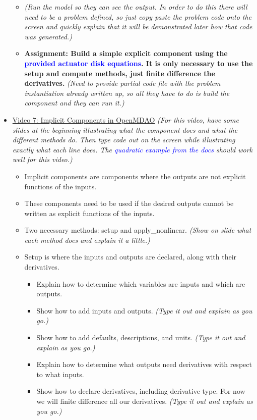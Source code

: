 \documentclass[12pt, letterpaper]{article}
\begin{document}
\begin{itemize}
\begin{itemize}
			\item \textit{(Run the model so they can see the output. In order to do this there will need to be a problem defined, so just copy paste the problem code onto the screen and quickly explain that it will be demonstrated later how that code was generated.)}
			\item \textbf{Assignment: Build a simple explicit component using the \textcolor{blue}{provided actuator disk equations}. It is only necessary to use the setup and compute methods, just finite difference the derivatives.} \textit{(Need to provide partial code file with the problem instantiation already written up, so all they have to do is build the component and they can run it.)}
		\end{itemize}

	\item \underline{Video 7: Implicit Components in OpenMDAO} \textit{(For this video, have some slides at the beginning illustrating what the component does and what the different methods do. Then type code out on the screen while illustrating exactly what each line does. The 					\textcolor{blue}{quadratic example from the docs} should work well for this video.)}
		\begin{itemize}
			\item Implicit components are components where the outputs are not explicit functions of the inputs.
			\item These components need to be used if the desired outputs cannot be written as explicit functions of the inputs.
			\item Two necessary methods: setup and apply\_nonlinear. \textit{(Show on slide what each method does and explain it a little.)}
			\item Setup is where the inputs and outputs are declared, along with their derivatives.
				\begin{itemize}
					\item Explain how to determine which variables are inputs and which are outputs.
					\item Show how to add inputs and outputs. \textit{(Type it out and explain as you go.)}
					\item Show how to add defaults, descriptions, and units. \textit{(Type it out and explain as you go.)}
					\item Explain how to determine what outputs need derivatives with respect to what inputs.
					\item Show how to declare derivatives, including derivative type. For now we will finite difference all our derivatives. \textit{(Type it out and explain as you go.)}

\end{itemize}
\end{itemize}
\end{itemize}
\end{document}
